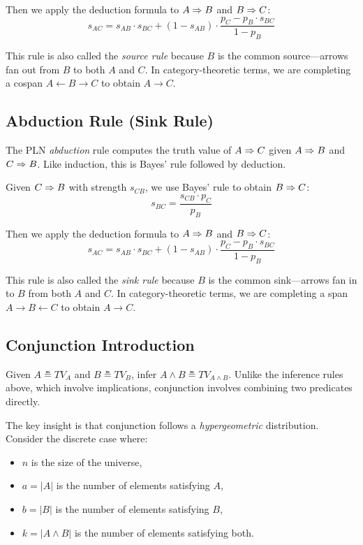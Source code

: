 \documentclass[]{article}
\begin{document}
Then we apply the deduction formula to $A \Rightarrow B$ and $B \Rightarrow C$:
$$s_{AC} = s_{AB} \cdot s_{BC} + (1 - s_{AB}) \cdot \frac{p_C - p_B \cdot s_{BC}}{1 - p_B}$$

This rule is also called the \emph{source rule} because $B$ is the
common source---arrows fan out from $B$ to both $A$ and $C$.  In
category-theoretic terms, we are completing a cospan $A \leftarrow B
\to C$ to obtain $A \to C$.

\subsection{Abduction Rule (Sink Rule)}
\label{sec:abduction}
The PLN \emph{abduction} rule computes the truth value of $A \Rightarrow C$
given $A \Rightarrow B$ and $C \Rightarrow B$.  Like induction, this is Bayes'
rule followed by deduction.

Given $C \Rightarrow B$ with strength $s_{CB}$, we use Bayes' rule to obtain
$B \Rightarrow C$:
$$s_{BC} = \frac{s_{CB} \cdot p_C}{p_B}$$

Then we apply the deduction formula to $A \Rightarrow B$ and $B \Rightarrow C$:
$$s_{AC} = s_{AB} \cdot s_{BC} + (1 - s_{AB}) \cdot \frac{p_C - p_B \cdot s_{BC}}{1 - p_B}$$

This rule is also called the \emph{sink rule} because $B$ is the
common sink---arrows fan in to $B$ from both $A$ and $C$.  In
category-theoretic terms, we are completing a span $A \to B \leftarrow
C$ to obtain $A \to C$.

\subsection{Conjunction Introduction}
\label{sec:conjunction}
Given $A \measeq TV_A$ and $B \measeq TV_B$, infer $A \land B \measeq
TV_{A\land B}$.  Unlike the inference rules above, which involve
implications, conjunction involves combining two predicates directly.

The key insight is that conjunction follows a \emph{hypergeometric}
distribution.  Consider the discrete case where:
\begin{itemize}
\item $n$ is the size of the universe,
\item $a = |A|$ is the number of elements satisfying $A$,
\item $b = |B|$ is the number of elements satisfying $B$,
\item $k = |A \land B|$ is the number of elements satisfying both.
\end{itemize}
\end{document}

